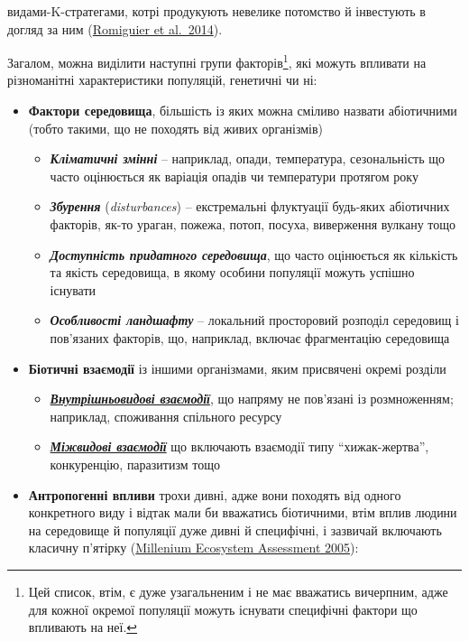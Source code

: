 \documentclass[
  11pt,
]{book}
\begin{document}
видами-K-стратегами, котрі продукують невелике потомство й інвестують в догляд за ним (\href{https://doi.org/10.1038/nature13685}{Romiguier et al.~2014}).

Загалом, можна виділити наступні групи факторів\footnote{Цей список, втім, є дуже узагальненим і не має вважатись вичерпним, адже для кожної окремої популяції можуть існувати специфічні фактори що впливають на неї.}, які можуть впливати на різноманітні характеристики популяцій, генетичні чи ні:

\begin{itemize}
\item
  \textbf{Фактори середовища}, більшість із яких можна сміливо назвати абіотичними (тобто такими, що не походять від живих організмів)

  \begin{itemize}
  \item
    \textbf{\emph{Кліматичні змінні}} -- наприклад, опади, температура, сезональність що часто оцінюється як варіація опадів чи температури протягом року
  \item
    \textbf{\emph{Збурення}} (\emph{disturbances}) -- екстремальні флуктуації будь-яких абіотичних факторів, як-то ураган, пожежа, потоп, посуха, виверження вулкану тощо
  \item
    \textbf{\emph{Доступність придатного середовища}}, що часто оцінюється як кількість та якість середовища, в якому особини популяції можуть успішно існувати
  \item
    \textbf{\emph{Особливості ландшафту}} -- локальний просторовий розподіл середовищ і пов'язаних факторів, що, наприклад, включає фрагментацію середовища
  \end{itemize}
\item
  \textbf{Біотичні взаємодії} із іншими організмами, яким присвячені окремі розділи

  \begin{itemize}
  \item
    \hyperref[intraspecific]{\textbf{\emph{Внутрішньовидові взаємодії}}}, що напряму не пов'язані із розмноженням; наприклад, споживання спільного ресурсу
  \item
    \hyperref[interspecific]{\textbf{\emph{Міжвидові взаємодії}}} що включають взаємодії типу ``хижак-жертва'', конкуренцію, паразитизм тощо
  \end{itemize}
\item
  \textbf{Антропогенні впливи} трохи дивні, адже вони походять від одного конкретного виду і відтак мали би вважатись біотичними, втім вплив людини на середовище й популяції дуже дивні й специфічні, і зазвичай включають класичну п'ятірку (\href{https://www.millenniumassessment.org/documents/document.273.aspx.pdf}{Millenium Ecosystem Assessment 2005}):


\end{itemize}
\end{document}
